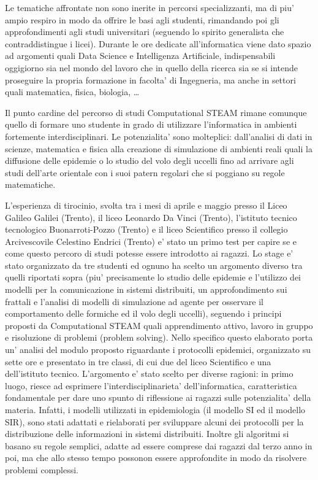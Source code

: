 Le tematiche affrontate non sono inerite in percorsi specializzanti, ma di piu' ampio respiro in modo da offrire le basi agli studenti, rimandando poi gli approfondimenti agli studi universitari (seguendo lo spirito generalista che contraddistingue i licei). Durante le ore dedicate all'informatica viene dato spazio ad argomenti quali Data Science e Intelligenza Artificiale, indispensabili oggigiorno sia nel mondo del lavoro che in quello della ricerca sia se si intende proseguire la propria formazione in facolta' di Ingegneria, ma anche in settori quali matematica, fisica, biologia, \dots

Il punto cardine del percorso di studi Computational STEAM rimane comunque quello di formare uno studente in grado di utilizzare l'informatica in ambienti fortemente interdisciplinari. Le potenzialita' sono molteplici: dall'analisi di dati in scienze, matematica e fisica alla creazione di simulazione di ambienti reali quali la diffusione delle epidemie o lo studio del volo degli uccelli fino ad arrivare agli studi dell'arte orientale con i suoi patern regolari che si poggiano su regole matematiche.

L'esperienza di tirocinio, svolta tra i mesi di aprile e maggio presso il Liceo Galileo Galilei (Trento), il liceo Leonardo Da Vinci (Trento), l’istituto tecnico tecnologico Buonarroti-Pozzo (Trento) e il liceo Scientifico presso il collegio Arcivescovile Celestino Endrici (Trento) e' stato un primo test per capire se e come questo percoro di studi potesse essere introdotto ai ragazzi. 
Lo stage e' stato organizzato da tre studenti ed ognuno ha scelto un argomento diverso tra quelli riportati sopra (piu' precisamente lo studio delle epidemie e l'utilizzo dei modelli per la comunicazione in sistemi distribuiti, un approfondimento sui frattali e l'analisi di modelli di simulazione ad agente per osservare il comportamento delle formiche ed il volo degli uccelli), seguendo i principi proposti da Computational STEAM quali apprendimento attivo, lavoro in gruppo e risoluzione di problemi (problem solving). Nello specifico questo elaborato porta un' analisi del modulo proposto riguardante i protocolli epidemici, organizzato su sette ore e presentato in tre classi, di cui due del liceo Scientifico e una dell'istituto tecnico. L'argomento e' stato scelto per diverse ragioni: in primo luogo, riesce ad esprimere l'interdisciplinarieta' dell'informatica, caratteristica fondamentale per dare uno spunto di riflessione ai ragazzi sulle potenzialita' della materia. Infatti, i modelli utilizzati in epidemiologia (il modello SI ed il modello SIR), sono stati adattati e rielaborati per sviluppare alcuni dei protocolli per la distribuzione delle informazioni in sistemi distribuiti. Inoltre gli algoritmi si basano su regole semplici, adatte ad essere comprese dai ragazzi dal terzo anno in poi, ma che allo stesso tempo possonon essere approfondite in modo da risolvere problemi complessi. 

